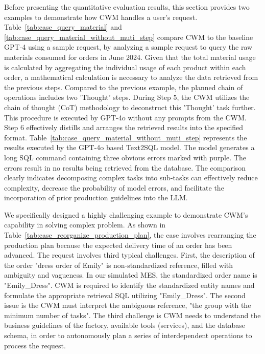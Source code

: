 \documentclass[preprint,12pt]{elsarticle}
\begin{document}
Before presenting the quantitative evaluation results, this section provides two examples to demonstrate how CWM handles a user's request.
Table~\ref{tab:case_query_material} and \ref{tab:case_query_material_without_muti_step} compare CWM to the baseline GPT-4 using a sample request, by analyzing a sample request to query the raw materials consumed for orders in June 2024.
Given that the total material usage is calculated by aggregating the individual usage of each product within each order, a mathematical calculation is necessary to analyze the data retrieved from the previous steps. 
Compared to the previous example, the planned chain of operations includes two 'Thought' steps. 
During Step 5, the CWM utilizes the chain of thought (CoT) methodology to deconstruct this 'Thought' task further. 
This procedure is executed by GPT-4o without any prompts from the CWM. 
Step 6 effectively distills and arranges the retrieved results into the specified format.
Table~\ref{tab:case_query_material_without_muti_step} represents the results executed by the GPT-4o based Text2SQL model. 
The model generates a long SQL command containing three obvious errors marked with purple.
The errors result in no results being retrieved from the database.
The comparison clearly indicates decomposing complex tasks into sub-tasks can effectively reduce complexity, decrease the probability of model errors, and facilitate the incorporation of prior production guidelines into the LLM.


We specifically designed a highly challenging example to demonstrate CWM's capability in solving complex problem.
As shown in Table~\ref{tab:case_reorganize_production_plan}, the case involves rearranging the production plan because the expected delivery time of an order has been advanced.
The request involves third typical challenges.
First, the description of the order "dress order of Emily" is non-standardized reference, filled with ambiguity and vagueness.
In our simulated MES, the standardized order name is "Emily\_Dress".
CWM is required to identify the standardized entity names and formulate the appropriate retrieval SQL utilizing "Emily\_Dress". 
The second issue is the CWM must interpret the ambiguous reference, "the group with the minimum number of tasks".
The third challenge is CWM needs to understand the business guidelines of the factory, available tools (services), and the database schema, in order to autonomously plan a series of interdependent operations to process the request.
\end{document}
